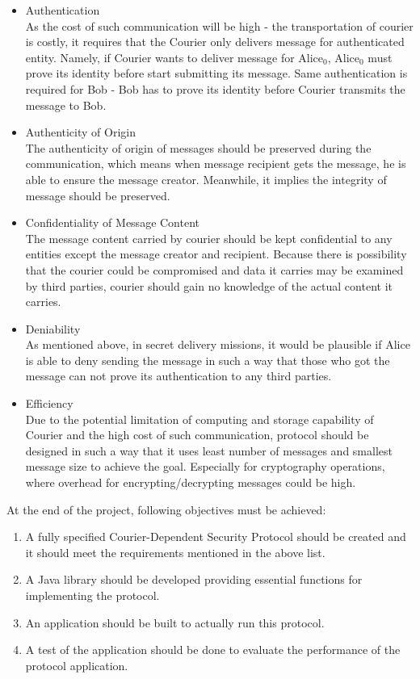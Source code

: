 \begin{itemize}
\item Authentication \\
As the cost of such communication will be high - the transportation of courier is costly, it requires that the Courier only delivers message for authenticated entity. Namely, if Courier wants to deliver message for Alice$_0$, Alice$_0$ must prove its identity before start submitting its message. Same authentication is required for Bob - Bob has to prove its identity before Courier transmits the message to Bob.

\item Authenticity of Origin \\
The authenticity of origin of messages should be preserved during the communication, which means when message recipient gets the message, he is able to ensure the message creator. Meanwhile, it implies the integrity of message should be preserved.

\item Confidentiality of Message Content \\
The message content carried by courier should be kept confidential to any entities except the message creator and recipient. Because there is possibility that the courier could be compromised and data it carries may be examined by third parties, courier should gain no knowledge of the actual content it carries.

\item Deniability \\
As mentioned above, in secret delivery missions, it would be plausible if Alice is able to deny sending the message in such a way that those who got the message can not prove its authentication to any third parties.

\item Efficiency \\
Due to the potential limitation of computing and storage capability of Courier and the high cost of such communication, protocol should be designed in such a way that it uses least number of messages and smallest message size to achieve the goal. Especially for cryptography operations, where overhead for encrypting/decrypting messages could be high.
\end{itemize}

\noindent
At the end of the project, following objectives must be achieved:
\begin{enumerate}
\item A fully specified Courier-Dependent Security Protocol should be created and it should meet the requirements mentioned in the above list.
\item A Java library should be developed providing essential functions for implementing the protocol.
\item An application should be built to actually run this protocol.
\item A test of the application should be done to evaluate the performance of the protocol application.
\end{enumerate}

